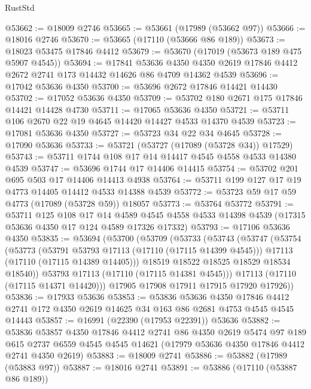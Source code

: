 \begin{lexlean}{RustStd}
\begin{coremodule}
@53662 := @18009 @2746
@53665 := @53661 (@17989 (@53662 @97))
@53666 := @18016 @2746
@53670 := @53665 (@17110 (@53666 @86 @189))
@53673 := @18023 @53475 @17846 @4412
@53679 := @53670 (@17019 (@53673 @189 @475 @5907 @4545))
@53694 := @17841
    @53636
    @4350
    @4350
    @2619
    @17846
    @4412
    @2672
    @2741
    @173
    @14432
    @14626
    @86
    @4709
    @14362
    @4539
@53696 := @17042 @53636 @4350
@53700 := @53696 @2672 @17846 @14421 @14430
@53702 := @17052 @53636 @4350
@53709 := @53702 @180 @2671 @175 @17846 @14421 @14428 @4730
@53711 := @17065 @53636 @4350
@53721 := @53711 @106 @2670 @22 @19 @4645 @14420 @14427 @4533 @14370 @4539
@53723 := @17081 @53636 @4350
@53727 := @53723 @34 @22 @34 @4645
@53728 := @17090 @53636
@53733 := @53721 (@53727 (@17089 (@53728 @34)) @17529)
@53743 := @53711 @1744 @108 @17 @14 @14417 @4545 @4558 @4533 @14380 @4539
@53747 := @53696 @1744 @17 @14406 @14415
@53754 := @53702 @201 @695 @503 @17 @14406 @14413 @4938
@53764 := @53711 @199 @127 @17 @19 @4773 @14405 @14412 @4533 @14388 @4539
@53772 := @53723 @59 @17 @59 @4773 (@17089 (@53728 @59)) @18057
@53773 := @53764 @53772
@53791 := @53711
    @125
    @108
    @17
    @14
    @4589
    @4545
    @4558
    @4533
    @14398
    @4539
    (@17315 @53636 @4350 @17 @124 @4589 @17326 @17332)
@53793 := @17106 @53636 @4350
@53835 := @53694
    (@53700
      (@53709
        (@53733
          (@53743
            (@53747
              (@53754
                (@53773
                  (@53791 @53793 @17113 (@17110 (@17115 @14399 @4545)))
                  @17113
                  (@17110 (@17115 @14389 @14405)))
                @18519
                @18522
                @18525
                @18529
                @18534
                @18540))
            @53793
            @17113
            (@17110 (@17115 @14381 @4545)))
          @17113
          (@17110 (@17115 @14371 @14420)))
        @17905
        @17908
        @17911
        @17915
        @17920
        @17926))
@53836 := @17933 @53636
@53853 := @53836
    @53636
    @4350
    @17846
    @4412
    @2741
    @172
    @4350
    @2619
    @14625
    @34
    @163
    @86
    @2681
    @4753
    @4545
    @4545
    @14443
@53857 := @16991 (@22390 (@17953 @22391)) @53636
@53882 := @53836
    @53857
    @4350
    @17846
    @4412
    @2741
    @86
    @4350
    @2619
    @5474
    @97
    @189
    @615
    @2737
    @6559
    @4545
    @4545
    @14621
    (@17979 @53636 @4350 @17846 @4412 @2741 @4350 @2619)
@53883 := @18009 @2741
@53886 := @53882 (@17989 (@53883 @97))
@53887 := @18016 @2741
@53891 := @53886 (@17110 (@53887 @86 @189))

\end{coremodule}
\end{lexlean}
